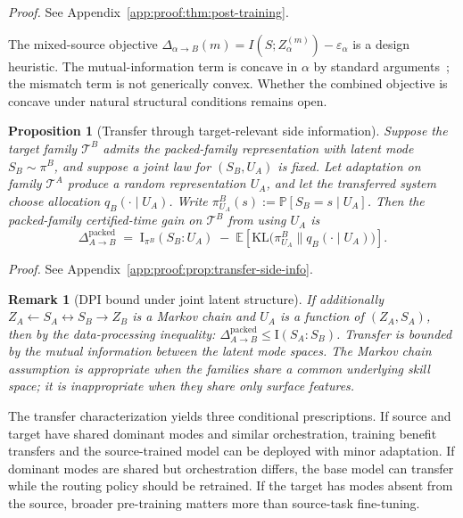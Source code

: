 \documentclass[10pt]{article}
\theoremstyle{paperplain}
\newtheorem{proposition}[theorem]{Proposition}
\theoremstyle{paperdefinition}
\theoremstyle{paperremark}
\newtheorem{remark}[theorem]{Remark}
\newcommand{\KL}{\mathrm{KL}}
\newcommand{\I}{\mathrm{I}}
\newcommand{\E}{\mathbb{E}}
\newcommand{\Prb}{\mathbb{P}}
\newcommand{\cT}{\mathcal{T}}
\begin{document}
\par\noindent\emph{Proof.} See Appendix~\ref{app:proof:thm:post-training}.\par


The mixed-source objective $\Delta_{\alpha \to B}(m) = I(S; Z_\alpha^{(m)}) - \varepsilon_\alpha$ is a design heuristic. The mutual-information term is concave in $\alpha$ by standard arguments~\cite{cover-thomas2006}; the mismatch term is not generically convex. Whether the combined objective is concave under natural structural conditions remains open.

\begin{proposition}[Transfer through target-relevant side information]
\label{prop:transfer-side-info}
Suppose the target family $\cT^B$ admits the packed-family representation with latent mode $S_B \sim \pi^B$, and suppose a joint law for $(S_B,U_A)$ is fixed.
Let adaptation on family $\cT^A$ produce a random representation $U_A$, and let the transferred system choose allocation $q_B(\cdot \mid U_A)$.
Write $\pi^B_{U_A}(s) := \Prb[S_B = s \mid U_A]$.
Then the packed-family certified-time gain on $\cT^B$ from using $U_A$ is
\begin{equation}
\label{eq:transfer-gain}
\Delta^{\mathrm{packed}}_{A \to B}
\;=\; \I_{\pi^B}(S_B : U_A)
\;-\; \E\!\left[\KL\bigl(\pi^B_{U_A} \| q_B(\cdot \mid U_A)\bigr)\right].
\end{equation}
\end{proposition}

\par\noindent\emph{Proof.} See Appendix~\ref{app:proof:prop:transfer-side-info}.\par


\begin{remark}[DPI bound under joint latent structure]
\label{rem:dpi-transfer}
If additionally $Z_A \leftarrow S_A \leftrightarrow S_B \rightarrow Z_B$ is a Markov chain and $U_A$ is a function of $(Z_A,S_A)$, then by the data-processing inequality:
$\Delta^{\mathrm{packed}}_{A \to B} \le \I(S_A : S_B)$.
Transfer is bounded by the mutual information between the latent mode spaces.
The Markov chain assumption is appropriate when the families share a common underlying skill space; it is inappropriate when they share only surface features.
\end{remark}

The transfer characterization yields three conditional prescriptions. If source and target have shared dominant modes and similar orchestration, training benefit transfers and the source-trained model can be deployed with minor adaptation. If dominant modes are shared but orchestration differs, the base model can transfer while the routing policy should be retrained. If the target has modes absent from the source, broader pre-training matters more than source-task fine-tuning.
\end{document}
